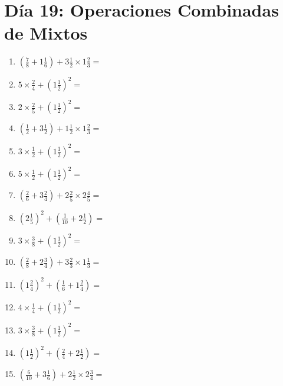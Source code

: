 \documentclass[12pt]{article}
\begin{document}
\section*{Día 19: Operaciones Combinadas de Mixtos}
\begin{enumerate}
\item \large $ (\frac{7}{8} + 1 \frac{1}{6}) + 3 \frac{1}{2} \times 1 \frac{2}{3} = $ \vspace{1.8cm}
\item \large $ 5 \times \frac{2}{4} + (1 \frac{1}{2})^2 = $ \vspace{1.8cm}
\item \large $ 2 \times \frac{2}{5} + (1 \frac{1}{2})^2 = $ \vspace{1.8cm}
\item \large $ (\frac{1}{2} + 3 \frac{1}{2}) + 1 \frac{1}{2} \times 1 \frac{2}{3} = $ \vspace{1.8cm}
\item \large $ 3 \times \frac{1}{2} + (1 \frac{1}{2})^2 = $ \vspace{1.8cm}
\item \large $ 5 \times \frac{1}{2} + (1 \frac{1}{2})^2 = $ \vspace{1.8cm}
\item \large $ (\frac{2}{6} + 3 \frac{2}{4}) + 2 \frac{2}{5} \times 2 \frac{4}{5} = $ \vspace{1.8cm}
\item \large $ (2 \frac{1}{5})^2 + (\frac{1}{10} + 2 \frac{1}{2}) = $ \vspace{1.8cm}
\item \large $ 3 \times \frac{3}{8} + (1 \frac{1}{2})^2 = $ \vspace{1.8cm}
\item \large $ (\frac{2}{8} + 2 \frac{3}{4}) + 3 \frac{2}{3} \times 1 \frac{1}{3} = $ \vspace{1.8cm}
\newpage
\item \large $ (1 \frac{2}{4})^2 + (\frac{1}{6} + 1 \frac{2}{4}) = $ \vspace{1.8cm}
\item \large $ 4 \times \frac{1}{4} + (1 \frac{1}{2})^2 = $ \vspace{1.8cm}
\item \large $ 3 \times \frac{3}{8} + (1 \frac{1}{2})^2 = $ \vspace{1.8cm}
\item \large $ (1 \frac{1}{2})^2 + (\frac{2}{4} + 2 \frac{1}{2}) = $ \vspace{1.8cm}
\item \large $ (\frac{6}{10} + 3 \frac{1}{6}) + 2 \frac{1}{2} \times 2 \frac{3}{4} = $ \vspace{1.8cm}

\end{enumerate}
\end{document}
